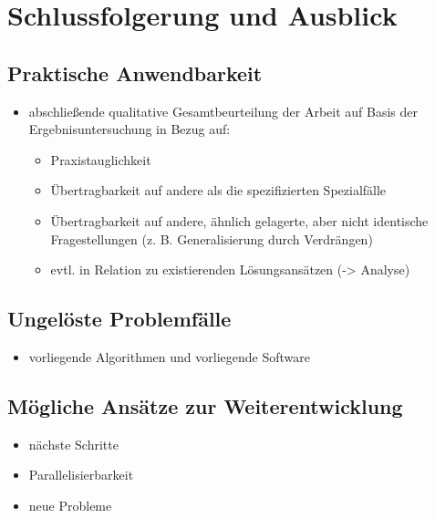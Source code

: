 \chapter{Schlussfolgerung und Ausblick}

\section{Praktische Anwendbarkeit}

\begin{itemize}
	\item abschließende qualitative Gesamtbeurteilung der Arbeit auf Basis der Ergebnisuntersuchung in Bezug auf:
	\begin{itemize}
		\item Praxistauglichkeit
		\item Übertragbarkeit auf andere als die spezifizierten Spezialfälle
		\item Übertragbarkeit auf andere, ähnlich gelagerte, aber nicht identische Fragestellungen (z. B. Generalisierung durch Verdrängen)
		\item evtl. in Relation zu existierenden Lösungsansätzen (-> Analyse)
	\end{itemize}
\end{itemize}


\section{Ungelöste Problemfälle}

\begin{itemize}
	\item vorliegende Algorithmen und vorliegende Software
\end{itemize}


\section{Mögliche Ansätze zur Weiterentwicklung}

\begin{itemize}
	\item nächste Schritte
	\item Parallelisierbarkeit
	\item neue Probleme
\end{itemize}




